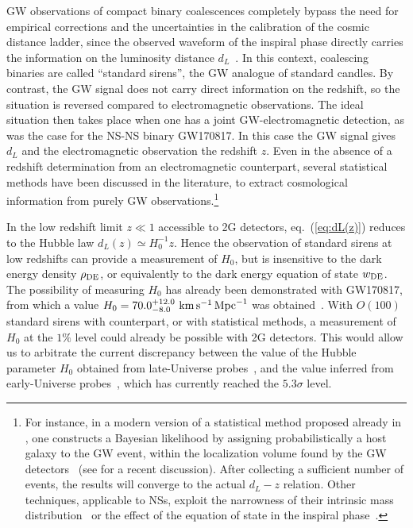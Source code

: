 GW observations of compact binary coalescences completely bypass the need for empirical corrections and the uncertainties in the  calibration of the cosmic distance ladder, since the observed waveform of the inspiral phase directly carries  the information on the luminosity distance $d_L$~\cite{Schutz:1986gp}. In this context, coalescing binaries are called ``standard sirens'', the GW analogue of standard candles. By contrast, the GW signal does not carry  direct information on the redshift, so the situation is reversed compared to electromagnetic observations. 
The ideal situation then takes place when one has a joint GW-electromagnetic detection, as was the case for the NS-NS binary GW170817. In this case the GW signal gives $d_L$ and the electromagnetic observation  the redshift $z$. Even in the absence of a redshift determination from an electromagnetic counterpart, several statistical methods have been discussed in the literature, to extract cosmological information from purely GW observations.\footnote{For instance, in a modern version of a statistical method proposed already in \cite{Schutz:1986gp}, one  constructs a Bayesian likelihood by assigning probabilistically a host galaxy to the GW event, within the localization volume found by the GW detectors~ (see \cite{DelPozzo:2011yh} for a recent discussion).  After collecting a sufficient number of events, the results will converge to the actual $d_L-z$ relation. Other techniques, applicable to NSs, exploit the narrowness of their intrinsic mass distribution~\cite{Taylor:2011fs,Taylor:2012db} or
the effect of the equation of state in the inspiral phase~\cite{Messenger:2011gi}.}

In the low redshift  limit $z\ll  1$ accessible to 2G detectors, eq.~(\ref{eq:dL(z)}) reduces to the Hubble law $d_{L}(z)\simeq H^{-1}_0z$. Hence the observation of standard sirens  at low redshifts can provide  a measurement of  $H_0$, but is insensitive to the dark energy density $\rho_{\rm DE}$, or equivalently to the dark energy equation of state $w_{\rm DE}$. The possibility of measuring $H_0$  has already been demonstrated with  GW170817, from which a value  $H_0=70.0^{+12.0}_{-8.0}\,\, {\rm km}\, {\rm s}^{-1}\, {\rm Mpc}^{-1}$ was obtained~\cite{Abbott:2017xzu}.  With $O(100)$ standard sirens with counterpart, or with statistical methods, a measurement of $H_0$ at the $1\%$ level could already be possible with 2G detectors. This would  allow us to  arbitrate the current discrepancy between the  value of the Hubble parameter $H_0$ obtained from  late-Universe probes~\cite{Riess:2019cxk,Wong:2019kwg}, and the  value  inferred from early-Universe probes~\cite{Aghanim:2018eyx,Abbott:2018xao}, which has currently reached the  $5.3\sigma$ level.

